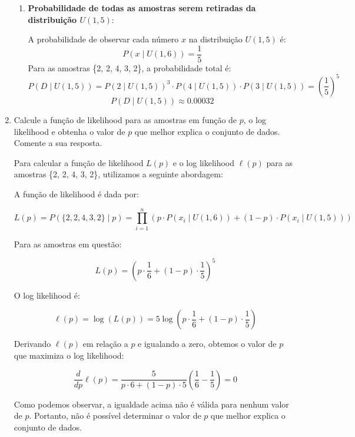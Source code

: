 \documentclass[12 pt]{article}
\begin{document}
\begin{enumerate}
\begin{tcolorbox}[colback=white, colframe=black, title=Resposta:]
\begin{enumerate}
            \item \textbf{Probabilidade de todas as amostras serem retiradas da distribuição \( U(1, 5) \)}:
            
            A probabilidade de observar cada número \( x \) na distribuição \( U(1, 5) \) é:
            \[
            P(x \mid U(1,6)) = \frac{1}{5}
            \]
            Para as amostras \{2, 2, 4, 3, 2\}, a probabilidade total é:
            \[
            P(D \mid U(1,5)) = P(2\mid U(1,5))^3 \cdot P(4\mid U(1,5)) \cdot P(3\mid U(1,5)) = \left(\frac{1}{5}\right)^5
            \]
            \[
            P(D \mid U(1,5)) \approx 0.00032
            \]
        \end{enumerate}
    \end{tcolorbox}

    \newpage
    \item Calcule a função de likelihood para as amostras em função de $p$, o log likelihood e obtenha o valor de $p$ que melhor explica o conjunto de dados. Comente a sua resposta.
    \begin{tcolorbox}[colback=white, colframe=black, title=Resposta:]
        Para calcular a função de likelihood \( L(p) \) e o log likelihood \( \ell(p) \) para as amostras \{2, 2, 4, 3, 2\}, utilizamos a seguinte abordagem:
        
        A função de likelihood é dada por:
        
        \[
        L(p) = P(\{2, 2, 4, 3, 2\} \mid p) = \prod_{i=1}^{n} \left( p \cdot P(x_i \mid U(1,6)) + (1 - p) \cdot P(x_i \mid U(1,5)) \right)
        \]
        
        Para as amostras em questão:
        
        \[
        L(p) = \left( p \cdot \frac{1}{6} + (1 - p) \cdot \frac{1}{5} \right)^5
        \]
        
        O log likelihood é:
        
        \[
        \ell(p) = \log(L(p)) = 5 \log\left( p \cdot \frac{1}{6} + (1 - p) \cdot \frac{1}{5} \right)
        \]
        
        Derivando \( \ell(p) \) em relação a \( p \) e igualando a zero, obtemos o valor de \( p \) que maximiza o log likelihood:
        
        \[
        \frac{d}{dp} \ell(p) = \frac{5}{p \cdot 6 + (1 - p) \cdot 5} \left( \frac{1}{6} - \frac{1}{5} \right) = 0
        \]

        Como podemos observar, a igualdade acima não é válida para nenhum valor de \( p \). Portanto, não é possível determinar o valor de \( p \) que melhor explica o conjunto de dados.
        \end{tcolorbox}
        

\end{enumerate}
\end{document}
